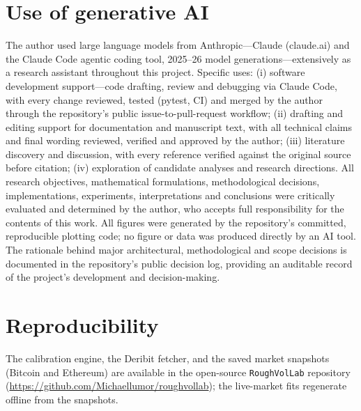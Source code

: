 \documentclass[namedate,webpdf]{ima-authoring-template}
\numberwithin{equation}{section}
\begin{document}
\section*{Use of generative AI}
The author used large language models from Anthropic---Claude (claude.ai) and the Claude
Code agentic coding tool, 2025--26 model generations---extensively as a research assistant
throughout this project. Specific uses: (i) software development support---code drafting,
review and debugging via Claude Code, with every change reviewed, tested (pytest, CI) and
merged by the author through the repository's public issue-to-pull-request workflow;
(ii) drafting and editing support for documentation and manuscript text, with all technical
claims and final wording reviewed, verified and approved by the author; (iii) literature
discovery and discussion, with every reference verified against the original source before
citation; (iv) exploration of candidate analyses and research directions. All research
objectives, mathematical formulations, methodological decisions, implementations,
experiments, interpretations and conclusions were critically evaluated and determined by
the author, who accepts full responsibility for the contents of this work. All figures
were generated by the repository's committed, reproducible plotting code; no figure or
data was produced directly by an AI tool. The rationale behind major architectural,
methodological and scope decisions is documented in the repository's public decision log,
providing an auditable record of the project's development and decision-making.

\section*{Reproducibility}
The calibration engine, the Deribit fetcher, and the saved market snapshots (Bitcoin and
Ethereum) are available in the open-source \texttt{RoughVolLab} repository
(\url{https://github.com/Michaellumor/roughvollab}); the live-market fits regenerate offline
from the snapshots.
\end{document}
